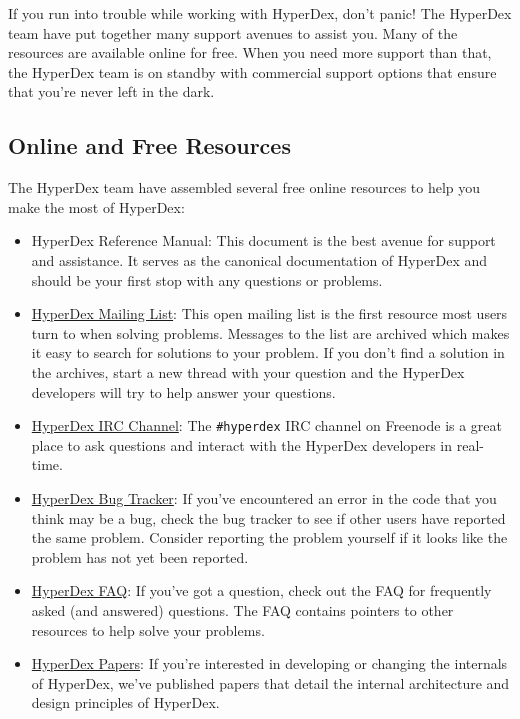 If you run into trouble while working with HyperDex, don't panic!  The HyperDex
team have put together many support avenues to assist you.  Many of the
resources are available online for free.  When you need more support than that,
the HyperDex team is on standby with commercial support options that ensure that
you're never left in the dark.

\subsection{Online and Free Resources}
\label{sec:introduction:support:free}

The HyperDex team have assembled several free online resources to help you make
the most of HyperDex:

\begin{itemize}
\item HyperDex Reference Manual:  This document is the best avenue for support
    and assistance.  It serves as the canonical documentation of HyperDex and
    should be your first stop with any questions or problems.
\item \href{https://groups.google.com/group/hyperdex-discuss}{HyperDex Mailing List}:
    This open mailing list is the first resource most users turn to when solving
    problems.  Messages to the list are archived which makes it easy to search
    for solutions to your problem.  If you don't find a solution in the
    archives, start a new thread with your question and the HyperDex developers
    will try to help answer your questions.
\item \href{http://webchat.freenode.net/?channels=hyperdex\&uio=d4}{HyperDex IRC Channel}:
    The \texttt{\#hyperdex} IRC channel on Freenode is a great place to ask
    questions and interact with the HyperDex developers in real-time.
\item \href{https://github.com/rescrv/HyperDex/issues}{HyperDex Bug Tracker}:
    If you've encountered an error in the code that you think may be a bug,
    check the bug tracker to see if other users have reported the same problem.
    Consider reporting the problem yourself if it looks like the problem has not
    yet been reported.
\item \href{http://hyperdex.org/FAQ/}{HyperDex FAQ}:
    If you've got a question, check out the FAQ for frequently asked (and
    answered) questions.  The FAQ contains pointers to other resources to help
    solve your problems.
\item \href{http://hyperdex.org/papers/}{HyperDex Papers}:
    If you're interested in developing or changing the internals of HyperDex,
    we've published papers that detail the internal architecture and design
    principles of HyperDex.
\end{itemize}

